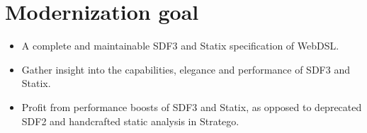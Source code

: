   \section{\label{sec:modernization}Modernization goal}

    \begin{itemize}
      \item A complete and maintainable SDF3 and Statix specification of WebDSL.
      \item Gather insight into the capabilities, elegance and performance of SDF3 and Statix.
      \item Profit from performance boosts of SDF3 and Statix, as opposed to deprecated SDF2 and handcrafted static analysis in Stratego.
    \end{itemize}
